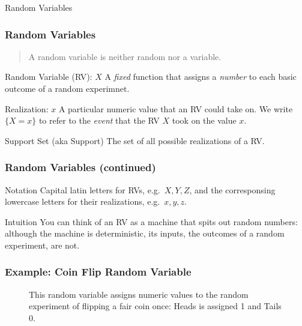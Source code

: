 \documentclass[handout]{beamer}
\begin{document}
\begin{frame}
  \begin{center}
  \Huge Random Variables
  \end{center}
\end{frame}
\def\RVraw{(-2.5,0) circle [radius=1.7]
	(-2.5,0) circle [radius=1.7]
	(2.5,0) circle [radius=1.7]
	node [above left] at (-3.75,1.25) {$S$}
	node [above right] at (3.75,1.25) {$\mathbb{R}$}
}
\begin{frame}
  \frametitle{Random Variables}
  \begin{quote}
    A random variable is neither random nor a variable.
  \end{quote}
\begin{block}{Random Variable (RV): $X$}
  A \emph{fixed} function that assigns a \emph{number} to each basic outcome of a random experimnet.
\end{block}
 
\begin{block}{Realization: $x$}
A particular numeric value that an RV could take on. We write $\{X = x\}$ to refer to the \emph{event} that the RV $X$ took on the value $x$.  
\end{block}
 
\begin{block}{Support Set (aka Support)}
The set of all possible realizations of a RV.
\end{block}
 
\end{frame}
\begin{frame}
  \frametitle{Random Variables (continued)}
\begin{block}{Notation}
Capital latin letters for RVs, e.g.\ $X,Y,Z$, and the corresponsing lowercase letters for their realizations, e.g.\ $x,y,z$.
\end{block}

\begin{block}{Intuition}
  You can think of an RV as a machine that spits out random numbers: although the machine is deterministic, its inputs, the outcomes of a random experiment, are not.
\end{block}
\end{frame}
\begin{frame}
\frametitle{Example: Coin Flip Random Variable}

\begin{figure}
\centering
{}
\caption{This random variable assigns numeric values to the random experiment of flipping a fair coin once: Heads is assigned 1 and Tails 0.}
\end{figure}
\end{frame}
\end{document}
